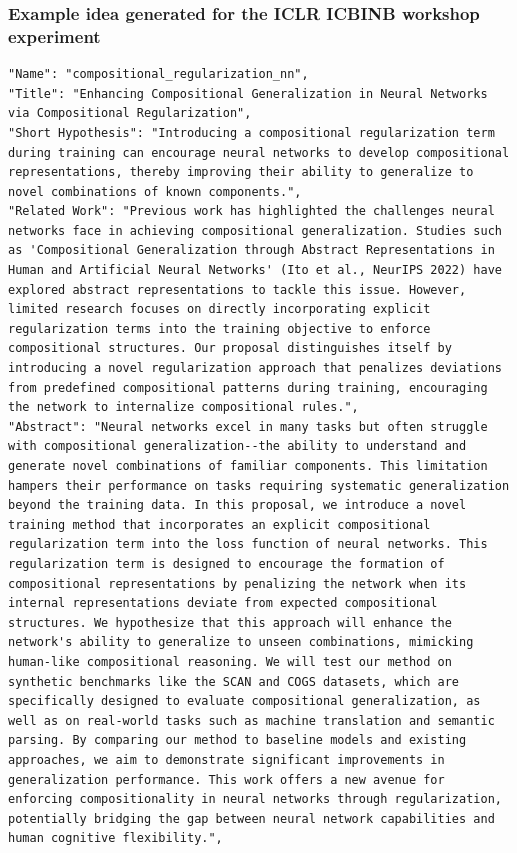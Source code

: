 \begin{appendices}
\subsubsection{Example idea generated for the ICLR ICBINB workshop experiment}
\label{idea:generated_for_workshop}
\begin{tcolorbox}[breakable, colback=orange!5!white, colframe=orange!80!black, title=Example idea generated for the ICLR ICBINB workshop experiment]
\begin{Verbatim}[breaklines, breaksymbol={}, breaksymbolleft={}, fontsize=\small]
"Name": "compositional_regularization_nn",
"Title": "Enhancing Compositional Generalization in Neural Networks via Compositional Regularization",
"Short Hypothesis": "Introducing a compositional regularization term during training can encourage neural networks to develop compositional representations, thereby improving their ability to generalize to novel combinations of known components.",
"Related Work": "Previous work has highlighted the challenges neural networks face in achieving compositional generalization. Studies such as 'Compositional Generalization through Abstract Representations in Human and Artificial Neural Networks' (Ito et al., NeurIPS 2022) have explored abstract representations to tackle this issue. However, limited research focuses on directly incorporating explicit regularization terms into the training objective to enforce compositional structures. Our proposal distinguishes itself by introducing a novel regularization approach that penalizes deviations from predefined compositional patterns during training, encouraging the network to internalize compositional rules.",
"Abstract": "Neural networks excel in many tasks but often struggle with compositional generalization--the ability to understand and generate novel combinations of familiar components. This limitation hampers their performance on tasks requiring systematic generalization beyond the training data. In this proposal, we introduce a novel training method that incorporates an explicit compositional regularization term into the loss function of neural networks. This regularization term is designed to encourage the formation of compositional representations by penalizing the network when its internal representations deviate from expected compositional structures. We hypothesize that this approach will enhance the network's ability to generalize to unseen combinations, mimicking human-like compositional reasoning. We will test our method on synthetic benchmarks like the SCAN and COGS datasets, which are specifically designed to evaluate compositional generalization, as well as on real-world tasks such as machine translation and semantic parsing. By comparing our method to baseline models and existing approaches, we aim to demonstrate significant improvements in generalization performance. This work offers a new avenue for enforcing compositionality in neural networks through regularization, potentially bridging the gap between neural network capabilities and human cognitive flexibility.",

\end{Verbatim}
\end{tcolorbox}
\end{appendices}

